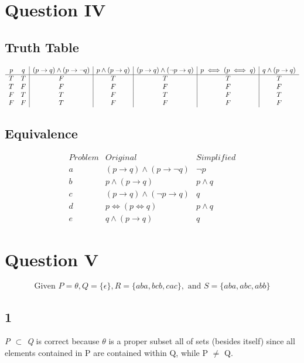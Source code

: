 \documentclass{article}
\begin{document}
\section*{Question IV}

\subsection*{Truth Table}
\begin{displaymath}
\begin{array}{c c|c|c|c|c|c} %
p & q & 
(p \rightarrow q) \land (p \rightarrow \neg q) & 
p \land (p \rightarrow q) & 
(p \rightarrow q) \land (\neg p \rightarrow q) &
p \iff (p \iff q) &
q \land (p \rightarrow q)
\\ 
\hline
T & T & F & T & T & T & T \\
T & F & F & F & F & F & F \\
F & T & T & F & T & F & T \\
F & F & T & F & F & F & F 
\end{array}
\end{displaymath}

\subsection*{Equivalence}
\begin{displaymath}
\begin{array}{c|c|c} %
Problem & Original & Simplified \\
\hline
a & (p \rightarrow q) \land (p \rightarrow \neg q) & \neg p \\ 
b & p \land (p \rightarrow q) & p \land q \\
c & (p \rightarrow q) \land (\neg p \rightarrow q) & q \\
d & p \iff (p \iff q) & p \land q \\
e & q \land (p \rightarrow q) & q
\end{array}
\end{displaymath}

\section*{Question V}

\[ \textrm{Given } P = \theta, Q=\{\epsilon\}, R=\{aba, bcb, cac\}, \textrm{ and } S=\{aba, abc, abb\}\]

\subsection{1}
\textit{P $\subset$ Q} is correct because $\theta$ is a proper subset all of sets (besides itself) since all elements contained in P are contained within Q, while P $\neq$ Q.
\end{document}

